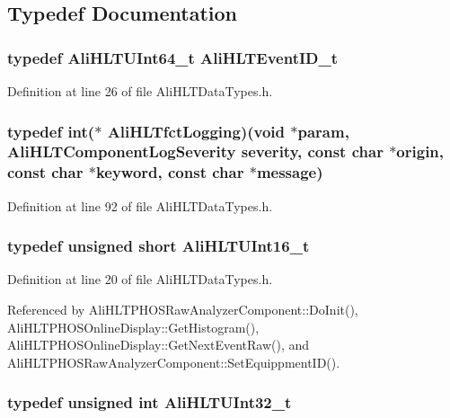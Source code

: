 \subsection{Typedef Documentation}
\subsubsection{\setlength{\rightskip}{0pt plus 5cm}typedef {\bf Ali\-HLTUInt64\_\-t} {\bf Ali\-HLTEvent\-ID\_\-t}}\label{AliHLTDataTypes_8h_a8}




Definition at line 26 of file Ali\-HLTData\-Types.h.
\subsubsection{\setlength{\rightskip}{0pt plus 5cm}typedef int($\ast$ {\bf Ali\-HLTfct\-Logging})(void $\ast$param, {\bf Ali\-HLTComponent\-Log\-Severity} severity, const char $\ast$origin, const char $\ast$keyword, const char $\ast$message)}\label{AliHLTDataTypes_8h_a17}




Definition at line 92 of file Ali\-HLTData\-Types.h.
\subsubsection{\setlength{\rightskip}{0pt plus 5cm}typedef unsigned short {\bf Ali\-HLTUInt16\_\-t}}\label{AliHLTDataTypes_8h_a5}




Definition at line 20 of file Ali\-HLTData\-Types.h.

Referenced by Ali\-HLTPHOSRaw\-Analyzer\-Component::Do\-Init(), Ali\-HLTPHOSOnline\-Display::Get\-Histogram(), Ali\-HLTPHOSOnline\-Display::Get\-Next\-Event\-Raw(), and Ali\-HLTPHOSRaw\-Analyzer\-Component::Set\-Equippment\-ID().
\subsubsection{\setlength{\rightskip}{0pt plus 5cm}typedef unsigned int {\bf Ali\-HLTUInt32\_\-t}}\label{AliHLTDataTypes_8h_a6}




